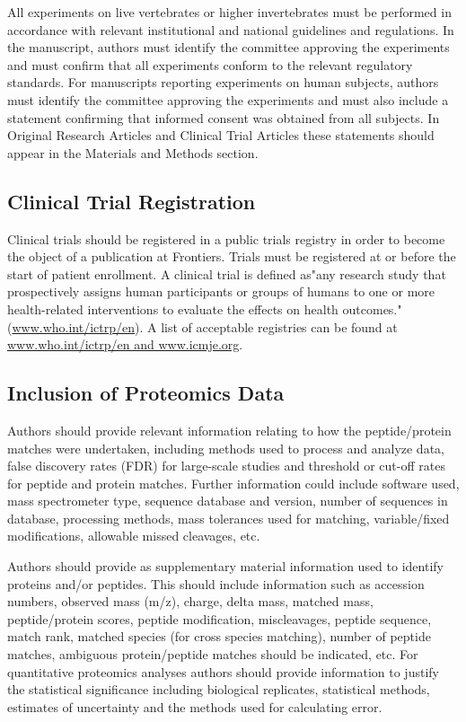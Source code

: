 \documentclass{frontiersENG} %
\begin{document}
All experiments on live vertebrates or higher invertebrates must be performed in accordance with relevant institutional and national guidelines and regulations. In the manuscript, authors must identify the committee approving the experiments and must confirm that all experiments conform to the relevant regulatory standards. For manuscripts reporting experiments on human subjects, authors must identify the committee approving the experiments and must also include a statement confirming that informed consent was obtained from all subjects. In Original Research Articles and Clinical Trial Articles these statements should appear in the Materials and Methods section.

\subsection{Clinical Trial Registration}

Clinical trials should be registered in a public trials registry in order to become the object of a publication at Frontiers. Trials must be registered at or before the start of patient enrollment. A clinical trial is defined as"any research study that prospectively assigns human participants or groups of humans to one or more health-related interventions to evaluate the effects on health outcomes."(\url{www.who.int/ictrp/en}). A list of acceptable registries can be found at \url{www.who.int/ictrp/en and www.icmje.org}.

\subsection{Inclusion of Proteomics Data}

Authors should provide relevant information relating to how the peptide/protein matches were undertaken, including methods used to process and analyze data, false discovery rates (FDR) for large-scale studies and threshold or cut-off rates for peptide and protein matches. Further information could include software used, mass spectrometer type, sequence database and version, number of sequences in database, processing methods, mass tolerances used for matching, variable/fixed modifications, allowable missed cleavages, etc.

Authors should provide as supplementary material information used to identify proteins and/or peptides. This should include information such as accession numbers, observed mass (m/z), charge, delta mass, matched mass, peptide/protein scores, peptide modification, miscleavages, peptide sequence, match rank, matched species (for cross species matching), number of peptide matches, ambiguous protein/peptide matches should be indicated, etc.
For quantitative proteomics analyses authors should provide information to justify the statistical significance including biological replicates, statistical methods, estimates of uncertainty and the methods used for calculating error.
\end{document}
